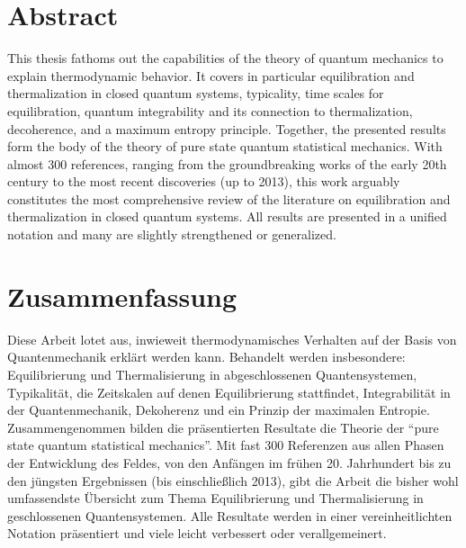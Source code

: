 \documentclass[a4paper,12pt,listof=totoc,index=totoc,bibliography=totoc,headsepline=false,headings=normal,BCOR16.153846mm,DIV12,headinclude,twoside,cleardoublepage=empty,numbers=noenddot,final]{scrreprt}
\theoremstyle{mystyle}
\numberwithin{equation}{section}
\numberwithin{figure}{section}
\numberwithin{lemma}{section}
\numberwithin{theorem}{section}
\numberwithin{corollary}{section}
\numberwithin{definition}{section}
\numberwithin{conjecture}{section}
\numberwithin{observation}{section}
\newcommand{\+}{\mkern2mu}
\DeclareMathOperator{\1}{\mathds{1}}
\begin{document}
\cleardoublepage

\section{Abstract}
%
This thesis fathoms out the capabilities of the theory of quantum mechanics to explain thermodynamic behavior.
It covers in particular equilibration and thermalization in closed quantum systems, typicality, time scales for equilibration, quantum integrability and its connection to thermalization, decoherence, and a maximum entropy principle.
Together, the presented results form the body of the theory of pure state quantum statistical mechanics.
With almost 300 references, ranging from the groundbreaking works of the early 20th century to the most recent discoveries (up to 2013), this work arguably constitutes the most comprehensive review of the literature on equilibration and thermalization in closed quantum systems.
All results are presented in a unified notation and many are slightly strengthened or generalized.


\cleardoublepage

\section{Zusammenfassung}
%
Diese Arbeit lotet aus, inwieweit thermodynamisches Verhalten auf der Basis von Quantenmechanik erklärt werden kann.
Behandelt werden insbesondere: Equilibrierung und Thermalisierung in abgeschlossenen Quantensystemen, Typikalität, die Zeitskalen auf denen Equilibrierung stattfindet, Integrabilität in der Quantenmechanik, Dekoherenz und ein Prinzip der maximalen Entropie.
Zusammengenommen bilden die präsentierten Resultate die Theorie der ``pure state quantum statistical mechanics''.
Mit fast 300 Referenzen aus allen Phasen der Entwicklung des Feldes, von den Anfängen im frühen 20. Jahrhundert bis zu den jüngsten Ergebnissen (bis einschließlich 2013), gibt die Arbeit die bisher wohl umfassendste Übersicht zum Thema Equilibrierung und Thermalisierung in geschlossenen Quantensystemen.
Alle Resultate werden in einer vereinheitlichten Notation präsentiert und viele leicht verbessert oder verallgemeinert.
\end{document}
